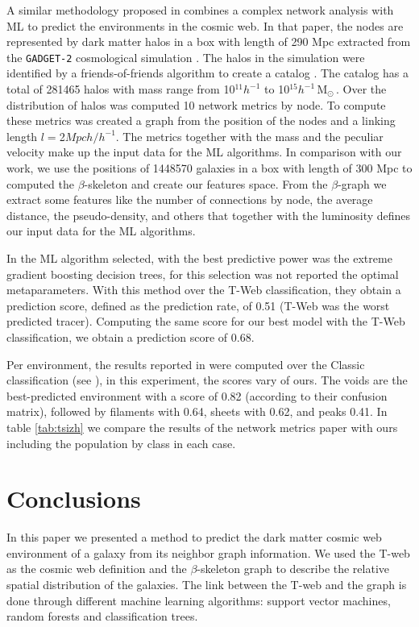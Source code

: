 \documentclass[usenatbib]{mnras}
\newcommand{\Msun}{\,{\rm M}$_{\odot}$\,}
\begin{document}
{A similar methodology proposed in \cite{Tsizh2019} combines a complex network analysis with ML to predict the environments in the cosmic web. In that paper, the nodes are represented by dark matter halos in a box with length of 290 Mpc extracted from the \texttt{GADGET-2} cosmological simulation \cite{Springel2005}. The halos in the simulation were identified by a friends-of-friends algorithm to create a catalog \cite{Libeskind2018}. The catalog has a total of 281465 halos with mass range from 10$^{11}h^{-1}$ to 10$^{15}h^{-1}$\Msun. Over the distribution of halos was computed 10 network metrics by node. To compute these metrics was created a graph from the position of the nodes and a linking length $l=$2$Mpch/h^{-1}$. The metrics together with the mass and the peculiar velocity make up the input data for the ML algorithms. In comparison with our work, we use the positions of 1448570 galaxies in a box with length of 300 Mpc to computed the $\beta$-skeleton and create our features space. From the $\beta$-graph we extract some features like the number of connections by node, the average distance, the pseudo-density, and others that together with the luminosity defines our input data for the ML algorithms.

In \cite{Tsizh2019} the ML algorithm selected, with the best predictive power was the extreme gradient boosting decision trees, for this selection was not reported the optimal metaparameters. With this method over the T-Web classification, they obtain a prediction score, defined as the prediction rate, of 0.51 (T-Web was the worst predicted tracer). Computing the same score for our best model with the T-Web classification, we obtain a prediction score of 0.68.

Per environment, the results reported in \cite{Tsizh2019} were computed over the Classic classification (see \cite{Libeskind2018}), in this experiment, the scores vary of ours. The voids are the best-predicted environment with a score of 0.82 (according to their confusion matrix), followed by filaments with 0.64, sheets with 0.62, and peaks 0.41. In table \ref{tab:tsizh} we compare the results of the network metrics paper with ours including the population by class in each case. 
}

\section{Conclusions}\label{sec:conclusions}

In this paper we presented a method to predict the dark matter cosmic web
environment of a galaxy from its neighbor graph information.
We used the T-web as the cosmic web definition \citep{Forero-Romero2009}
and the $\beta$-skeleton graph \citep{Fang2019} 
to describe the relative spatial distribution of the galaxies. 
The link between the T-web and the graph is done through different
machine learning algorithms: support vector machines, random forests and
classification trees.
\end{document}
